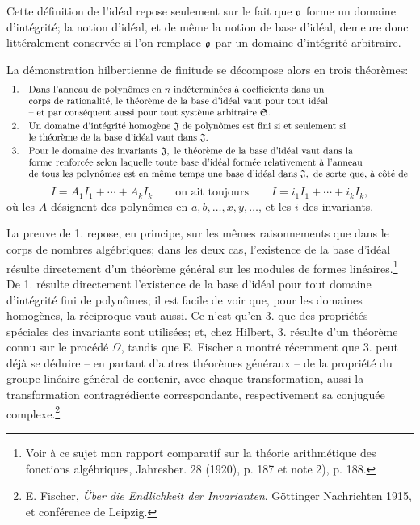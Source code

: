 Cette définition de l'idéal repose seulement sur le fait que $\mathfrak{o}$ forme un domaine d’intégrité; la notion d'idéal, et de même la notion de base d'idéal, demeure donc littéralement conservée si l'on remplace $\mathfrak{o}$ par un domaine d’intégrité arbitraire.

La démonstration hilbertienne de finitude se décompose alors en trois théorèmes:
\[
\begin{array}{ll}
1.& \text{Dans l'anneau de polynômes en }n\text{ indéterminées à coefficients dans un}\\
& \text{corps de rationalité, le théorème de la base d'idéal vaut pour tout idéal}\\
& \text{-- et par conséquent aussi pour tout système arbitraire }\mathfrak{S}.\\[2pt]
2.& \text{Un domaine d’intégrité homogène }\mathfrak{J}\text{ de polynômes est fini si et seulement si}\\
& \text{le théorème de la base d'idéal vaut dans }\mathfrak{J}.\\[2pt]
3.& \text{Pour le domaine des invariants }\mathfrak{J},\text{ le théorème de la base d'idéal vaut dans la}\\
& \text{forme renforcée selon laquelle toute base d'idéal formée relativement à l'anneau}\\
& \text{de tous les polynômes est en même temps une base d'idéal dans }\mathfrak{J},\text{ de sorte que, à côté de}
\end{array}
\]
\[
 I=A_1I_1+\cdots+A_kI_k
 \qquad\text{on ait toujours}\qquad
 I=i_1I_1+\cdots+i_kI_k,
\]
où les $A$ désignent des polynômes en $a,b,\ldots,x,y,\ldots$, et les $i$ des invariants.

La preuve de 1. repose, en principe, sur les mêmes raisonnements que dans le corps de nombres algébriques; dans les deux cas, l'existence de la base d'idéal résulte directement d'un théorème général sur les modules de formes linéaires.\footnote{Voir à ce sujet mon rapport comparatif sur la théorie arithmétique des fonctions algébriques, Jahresber. 28 (1920), p. 187 et note 2), p. 188.} De 1. résulte directement l'existence de la base d'idéal pour tout domaine d’intégrité fini de polynômes; il est facile de voir que, pour les domaines homogènes, la réciproque vaut aussi. Ce n'est qu'en 3. que des propriétés spéciales des invariants sont utilisées; et, chez Hilbert, 3. résulte d'un théorème connu sur le procédé $\Omega$, tandis que E. Fischer a montré récemment que 3. peut déjà se déduire -- en partant d'autres théorèmes généraux -- de la propriété du groupe linéaire général de contenir, avec chaque transformation, aussi la transformation contragrédiente correspondante, respectivement sa conjuguée complexe.\footnote{E. Fischer, \emph{Über die Endlichkeit der Invarianten}. Göttinger Nachrichten 1915, et conférence de Leipzig.}

